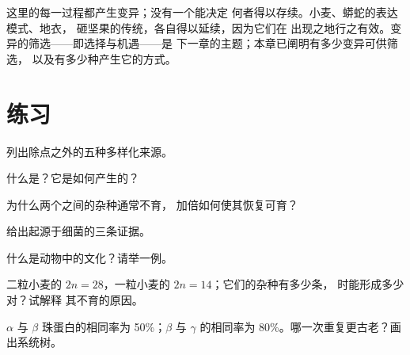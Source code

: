 \begin{remark}[多样化与选择]\label{rem:g12:diversification-of-life:selection}
这里的每一过程都产生变异；没有一个能决定
何者得以存续。小麦、蟒蛇的表达模式、地衣，
砸坚果的传统，各自得以延续，因为它们在
出现之地行之有效。变异的筛选——即选择与机遇——是
下一章的主题；本章已阐明有多少变异可供筛选，
以及有多少种产生它的方式。
\end{remark}

\section{练习}

\begin{exercise}[$\star$]\label{exo:g12:diversification-of-life:1}
列出除点之外的五种多样化来源。
\end{exercise}

\begin{exercise}[$\star$]\label{exo:g12:diversification-of-life:2}
什么是？它是如何产生的？
\end{exercise}

\begin{exercise}[$\star$]\label{exo:g12:diversification-of-life:3}
为什么两个之间的杂种通常不育，
加倍如何使其恢复可育？
\end{exercise}

\begin{exercise}[$\star$]\label{exo:g12:diversification-of-life:4}
给出起源于细菌的三条证据。
\end{exercise}

\begin{exercise}[$\star$]\label{exo:g12:diversification-of-life:5}
什么是动物中的文化？请举一例。
\end{exercise}

\begin{exercise}[$\star\star$]\label{exo:g12:diversification-of-life:6}
二粒小麦的 $2n = 28$，一粒小麦的 $2n = 14$；它们的杂种有多少条，
时能形成多少对？试解释
其不育的原因。
\end{exercise}

\begin{exercise}[$\star\star$]\label{exo:g12:diversification-of-life:7}
$\alpha$ 与 $\beta$ 珠蛋白的相同率为 50\%；$\beta$
与 $\gamma$ 的相同率为 80\%。哪一次重复更古老？画出系统树。
\end{exercise}

